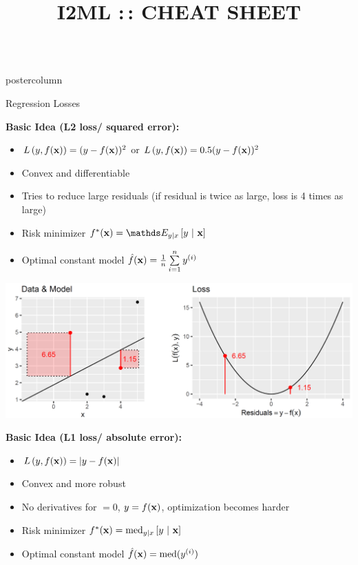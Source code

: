 \documentclass{beamer}
\title{I2ML :\,: CHEAT SHEET} %
\begin{document}
\begin{frame}[fragile]{}
\begin{columns}
	\begin{column}{.31\textwidth}
		\begin{beamercolorbox}[center]{postercolumn}
			\begin{minipage}{.98\textwidth}
				\parbox[t][\columnheight]{\textwidth}{
					\begin{myblock}{Regression Losses}
						\begin{codebox}
			\textbf{Basic Idea (L2 loss/ squared error):}
						\end{codebox}
						
						\begin{itemize}[$\bullet$]     
						\setlength{\itemindent}{+.3in}
              \item $L\left(y, f(\mathbf{x})\right) = (y-f(\mathbf{x}))^2$ or $L\left(y, f(\mathbf{x})\right) = 0.5 (y-f(\mathbf{x}))^2$
              \item Convex and differentiable
              \item Tries to reduce large residuals (if residual is twice as large, loss is 4 times as large)   
              \item Risk minimizer $\fxbayes = \E_{y|x} \left[y ~|~ \xv \right]$
              \item Optimal constant model $\hat{f}(\mathbf{x}) = \frac{1}{n} \sum\limits_{i=1}^n y^{(i)}$
            \end{itemize}

            \vspace*{1ex}
            \includegraphics[width=0.8\columnwidth]{img/reg_loss.PNG}

\begin{codebox}
\textbf{Basic Idea (L1 loss/ absolute error):}
\end{codebox}

\begin{itemize}[$\bullet$]     \setlength{\itemindent}{+.3in}
\item $L\left(y, f(\mathbf{x})\right) = |y-f(\mathbf{x})|$
\item Convex and more robust
\item No derivatives for $ = 0$, $y = f(\mathbf{x})$, optimization becomes harder
\item Risk minimizer $f^{\ast}(\mathbf{x}) = \text{med}_{y|x} \left[y ~|~ \mathbf{x} \right]$
\item Optimal constant model $\hat{f}(\mathbf{x}) = \text{med}(y^{(i)})$    
  \end{itemize}


\end{myblock}}
\end{minipage}
\end{beamercolorbox}
\end{column}
\end{columns}
\end{frame}
\end{document}
